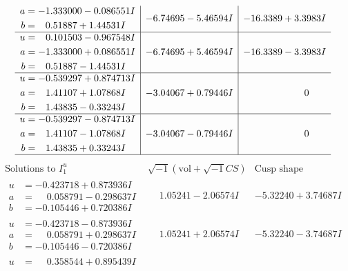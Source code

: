 \documentclass[1p]{elsarticle_modified}
\theoremstyle{definition}
\newcommand{\I}{\sqrt{-1}}
\begin{document}
$$\begin{array}{c|c|c}
\begin{aligned}
a &= -1.333000 - 0.086551 I \\
b &= \phantom{-}0.51887 + 1.44531 I\end{aligned}
 & -6.74695 - 5.46594 I & -16.3389 + 3.3983 I \\ \hline\begin{aligned}
u &= \phantom{-}0.101503 - 0.967548 I \\
a &= -1.333000 + 0.086551 I \\
b &= \phantom{-}0.51887 - 1.44531 I\end{aligned}
 & -6.74695 + 5.46594 I & -16.3389 - 3.3983 I \\ \hline\begin{aligned}
u &= -0.539297 + 0.874713 I \\
a &= \phantom{-}1.41107 + 1.07868 I \\
b &= \phantom{-}1.43835 - 0.33243 I\end{aligned}
 & -3.04067 + 0.79446 I & \phantom{-0.000000 } 0 \\ \hline\begin{aligned}
u &= -0.539297 - 0.874713 I \\
a &= \phantom{-}1.41107 - 1.07868 I \\
b &= \phantom{-}1.43835 + 0.33243 I\end{aligned}
 & -3.04067 - 0.79446 I & \phantom{-0.000000 } 0\\
 \hline 
 \end{array}$$\newpage$$\begin{array}{c|c|c}  
\text{Solutions to }I^u_{1}& \I (\text{vol} + \sqrt{-1}CS) & \text{Cusp shape}\\
 \hline 
\begin{aligned}
u &= -0.423718 + 0.873936 I \\
a &= \phantom{-}0.058791 - 0.298637 I \\
b &= -0.105446 + 0.720386 I\end{aligned}
 & \phantom{-}1.05241 - 2.06574 I & -5.32240 + 3.74687 I \\ \hline\begin{aligned}
u &= -0.423718 - 0.873936 I \\
a &= \phantom{-}0.058791 + 0.298637 I \\
b &= -0.105446 - 0.720386 I\end{aligned}
 & \phantom{-}1.05241 + 2.06574 I & -5.32240 - 3.74687 I \\ \hline\begin{aligned}
u &= \phantom{-}0.358544 + 0.895439 I \\

\end{aligned}
\end{array}$$
\end{document}
